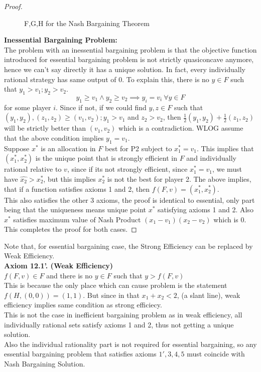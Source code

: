 \documentclass{article}
\theoremstyle{definition}
\begin{document}
\begin{proof}
\begin{figure}[H]
	\caption{F,G,H for the Nash Bargaining Theorem}
\end{figure}
\textbf{Inessential Bargaining Problem:}\\
The problem with an inessential bargaining problem is that the objective function introduced for essential bargaining problem is not strictly quasiconcave anymore, hence we can't say directly it has a unique solution. In fact, every individually rational strategy has same output of $0$. To explain this, there is no $y \in F$ such that $y_1>v_1;y_2>v_2$.
$$y_1\geq v_1 \land y_2\geq v_2 \implies y_i = v_i ~\forall y \in F$$ for some player $i$. Since if not, if we could find $y,z \in F$ such that $(y_1,y_2),(z_1,z_2)\geq (v_1,v_2);y_1>v_1$ and $z_2>v_2$, then $\frac{1}{2}(y_1,y_2) + \frac{1}{2}(z_1,z_2)$ will be strictly better than $(v_1,v_2)$ which is a contradiction. WLOG assume that the above condition implies $y_1 = v_1$.\\
Suppose $x^*$ is an allocation in $F$ best for P2 subject to $x_1^* = v_1$. This implies that $(x_1^*,x_2^*)$ is the unique point that is strongly efficient in $F$ and individually rational relative to $v$, since if its not strongly efficient, since $x_1^* = v_1$, we must have $\hat{x_2} > x_2^*$, but this implies $x_2^*$ is not the best for player 2. The above implies, that if a function satisfies axioms 1 and 2, then $f(F,v) = (x_1^*,x_2^*)$. \\
This also satisfies the other 3 axioms, the proof is identical to essential, only part being that the uniqueness means unique point $x^*$ satisfying axioms 1 and 2. Also $x^*$ satisfies maximum value of Nash Product $(x_1-v_1)(x_2-v_2)$ which is $0$. This completes the proof for both cases.
\end{proof}
Note that, for essential bargaining case, the Strong Efficiency can be replaced by Weak Efficiency.\\
\textbf{Axiom 12.1'. (Weak Efficiency)}\\
$f(F,v) \in F$ and there is no $y\in F$ such that $y>f(F,v)$\\

This is because the only place which can cause problem is the statement $f(H,(0,0)) = (1,1)$. But since in that $x_1+ x_2<2$, (a slant line), weak efficiency implies same condition as strong efficiecy.\\
This is not the case in inefficient bargaining problem as in weak efficiency, all individually rational sets satisfy axioms 1 and 2, thus not getting a unique solution.\\
Also the individual rationality part is not required for essential bargaining, so any essential bargaining problem that satisfies axioms $1',3,4,5$ must coincide with Nash Bargaining Solution.
\end{document}
